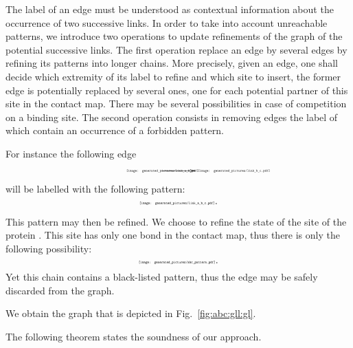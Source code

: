 \documentclass{entcs}
\begin{document}
The label of an edge must be understood as contextual information about the occurrence of two successive links. In order to take into account unreachable patterns, we introduce two operations to update refinements of the graph of the potential successive links. The first operation replace
an edge by several edges by refining its patterns into longer chains.
More precisely, given an edge, one shall decide which extremity of its label to refine and which site to insert, the former edge is potentially replaced by several ones, one for each potential partner of this site in the contact map. There may be several possibilities in case of competition on a binding site. The second operation consists in removing edges the label of which contain an occurrence of a forbidden pattern.


\begin{exmp}
  For instance the following edge
  \begin{equation*}\xymatrix@C=0.5cm@R=0.35cm{
  \begin{minipage}{1.2cm}
  \scalebox{0.35}{\texttt{[image: generated\_pictures/link\_a\_b.pdf]}}
  \end{minipage}
  \ar@{->}[rr]
  &&
  \begin{minipage}{1.2cm}
  \scalebox{0.35}{\texttt{[image: generated\_pictures/link\_b\_c.pdf]}}
  \end{minipage}}
  \end{equation*}
  will be labelled with the following pattern:
  \begin{equation*}
    \scalebox{0.35}{\texttt{[image: generated\_pictures/link\_a\_b\_c.pdf]}}.
  \end{equation*}

  This pattern may then be refined.
  We choose to refine the state of the site  of the protein . This site has only one bond in the contact map, thus there is only the following possibility:
  \begin{equation}
      \scalebox{0.35}{\texttt{[image: generated\_pictures/abc\_pattern.pdf]}}.
  \end{equation}
  Yet this chain contains a black-listed pattern, thus the edge may be safely discarded from the graph.

  We obtain the graph that is depicted in Fig.~\ref{fig:abc:gll:gl}.
\end{exmp}

The following theorem states the soundness of our approach.
\end{document}
